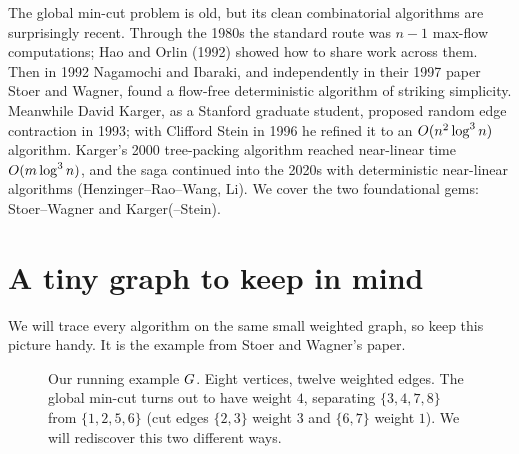 \begin{historybox}
The global min-cut problem is old, but its clean combinatorial algorithms are surprisingly recent. Through the 1980s the standard route was $n-1$ max-flow computations; Hao and Orlin (1992) showed how to share work across them. Then in 1992 Nagamochi and Ibaraki, and independently in their 1997 paper Stoer and Wagner, found a flow-free deterministic algorithm of striking simplicity. Meanwhile David Karger, as a Stanford graduate student, proposed random edge contraction in 1993; with Clifford Stein in 1996 he refined it to an $O(n^2\log^3 n)$ algorithm. Karger's 2000 tree-packing algorithm reached near-linear time $O(m\log^3 n)$, and the saga continued into the 2020s with deterministic near-linear algorithms (Henzinger--Rao--Wang, Li). We cover the two foundational gems: Stoer--Wagner and Karger(--Stein).
\end{historybox}

\section{A tiny graph to keep in mind}

We will trace every algorithm on the same small weighted graph, so keep this picture handy. It is the example from Stoer and Wagner's paper.

\begin{figure}[H]
\centering
{}
\caption{Our running example $G$. Eight vertices, twelve weighted edges. The global min-cut turns out to have weight $4$, separating $\{3,4,7,8\}$ from $\{1,2,5,6\}$ (cut edges $\{2,3\}$ weight $3$ and $\{6,7\}$ weight $1$). We will rediscover this two different ways.}
\label{ch11:fig-running}
\end{figure}

